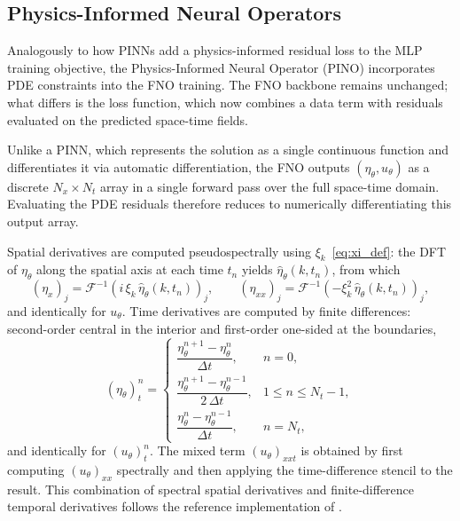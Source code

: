 \subsection{Physics-Informed Neural Operators}
\label{subsec:pino}

Analogously to how PINNs add a physics-informed residual loss to the MLP training objective, the Physics-Informed Neural Operator (PINO) \parencite{li2023pino} incorporates PDE constraints into the FNO training. The FNO backbone remains unchanged; what differs is the loss function, which now combines a data term with residuals evaluated on the predicted space-time fields.

Unlike a PINN, which represents the solution as a single continuous function and differentiates it via automatic differentiation, the FNO outputs $(\eta_\theta, u_\theta)$ as a discrete $N_x \times N_t$ array in a single forward pass over the full space-time domain. Evaluating the PDE residuals therefore reduces to numerically differentiating this output array.

Spatial derivatives are computed pseudospectrally using $\xi_k$~\eqref{eq:xi_def}: the DFT of $\eta_\theta$ along the spatial axis at each time $t_n$ yields $\hat{\eta}_\theta(k, t_n)$, from which
\begin{equation}
    (\eta_x)_j = \mathcal{F}^{-1}\!\left(i\,\xi_k\,\hat{\eta}_\theta(k,t_n)\right)_{\!j},
    \qquad
    (\eta_{xx})_j = \mathcal{F}^{-1}\!\left(-\xi_k^2\,\hat{\eta}_\theta(k,t_n)\right)_{\!j},
\end{equation}
and identically for $u_\theta$. Time derivatives are computed by finite differences: second-order central in the interior and first-order one-sided at the boundaries,
\begin{equation}
    (\eta_\theta)_t^n =
    \begin{cases}
        \dfrac{\eta_\theta^{n+1} - \eta_\theta^n}{\Delta t}, & n = 0, \\[6pt]
        \dfrac{\eta_\theta^{n+1} - \eta_\theta^{n-1}}{2\,\Delta t}, & 1 \le n \le N_t - 1, \\[6pt]
        \dfrac{\eta_\theta^n - \eta_\theta^{n-1}}{\Delta t}, & n = N_t,
    \end{cases}
\end{equation}
and identically for $(u_\theta)_t^n$. The mixed term $(u_\theta)_{xxt}$ is obtained by first computing $(u_\theta)_{xx}$ spectrally and then applying the time-difference stencil to the result. This combination of spectral spatial derivatives and finite-difference temporal derivatives follows the reference implementation of \textcite{li2023pino} \parencite{li2023pino_code}.

